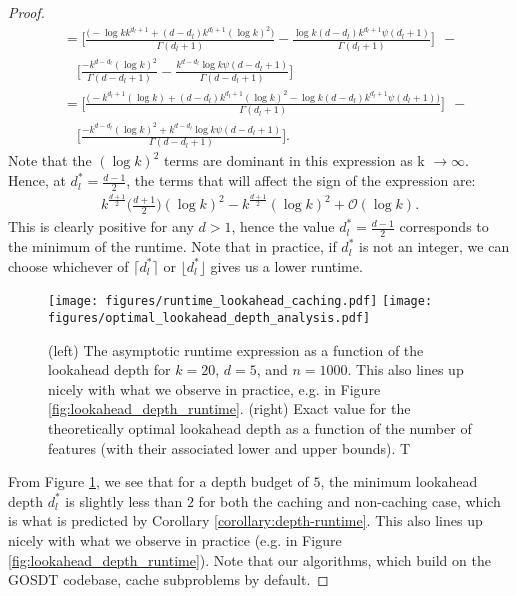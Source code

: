 \begin{proof}
\begin{align}
    &= \Bigg[\frac{\Big(-\log k k^{d_l+1} + (d-d_l) k^{d_l+1} (\log k)^2\Big)}{\Gamma(d_l+1)} - \frac{\log k (d-d_l) k^{d_l+1} \psi(d_l+1)}{\Gamma(d_l+1)}\Bigg] \ \ - \\
    &\quad \Bigg[\frac{-k^{d-d_l} (\log k)^2}{\Gamma(d-d_l+1)} - \frac{k^{d-d_l} \log k \psi(d-d_l+1)}{\Gamma(d-d_l+1)}\Bigg]\\
    &= \Bigg[\frac{\Big(-k^{d_l+1} (\log k)  + (d-d_l) k^{d_l+1} (\log k)^2 - \log k (d-d_l) k^{d_l+1} \psi(d_l+1)\Big)}{\Gamma(d_l+1)}\Bigg] \ \ - \\
    &\quad \Bigg[\frac{-k^{d-d_l} (\log k)^2 + k^{d-d_l} \log k \psi(d-d_l+1)}{\Gamma(d-d_l+1)}\Bigg].
\end{align}
Note that the $(\log k)^2$ terms are dominant in this expression as k $\rightarrow \infty$. Hence, at $d_l^* = \frac{d-1}{2}$, the terms that will affect the sign of the expression are: 
\begin{align}
    k^{\frac{d+1}{2}}\Big(\frac{d+1}{2}\Big)(\log k)^2 - k^{\frac{d+1}{2}}(\log k)^2 + \mathcal{O}(\textrm{$\log k$}).
\end{align}
This is clearly positive for any $d > 1$, hence the value $d_l^* = \frac{d-1}{2}$ corresponds to the minimum of the runtime. Note that in practice, if $d_l^*$ is not an integer, we can choose whichever of $\lceil d_l^*\rceil$ or $\lfloor d_l^* \rfloor$ gives us a lower runtime. 

\begin{figure}[t]
    \centering
    \texttt{[image: figures/runtime\_lookahead\_caching.pdf]}
    \texttt{[image: figures/optimal\_lookahead\_depth\_analysis.pdf]}
    \caption{(left) The asymptotic runtime expression as a function of the lookahead depth for $k=20$, $d = 5$, and $n=1000$. This also lines up nicely with what we observe in practice, e.g. in Figure \ref{fig:lookahead_depth_runtime}. (right) Exact value for the theoretically optimal lookahead depth as a function of the number of features (with their associated lower and upper bounds). T}
    \label{fig:runtime_vs_lookahead_depth_theory} 
\end{figure}
From Figure \ref{fig:runtime_vs_lookahead_depth_theory}, we see that for a depth budget of $5$, the minimum lookahead depth $d_l^*$ is slightly less than $2$ for both the caching and non-caching case, which is what is predicted by Corollary \ref{corollary:depth-runtime}. This also lines up nicely with what we observe in practice (e.g. in Figure \ref{fig:lookahead_depth_runtime}). Note that our algorithms, which build on the GOSDT codebase, cache subproblems by default.
\end{proof}
